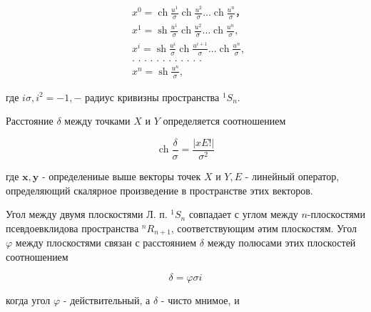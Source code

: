 \documentclass[10pt]{article}
\begin{document}
\[

\begin{aligned}

& x^{0}=\operatorname{ch} \frac{u^{1}}{\sigma} \operatorname{ch} \frac{u^{2}}{\sigma} \ldots \operatorname{ch} \frac{u^{n}}{\sigma} ， \\

& x^{1}=\operatorname{sh} \frac{u^{1}}{\sigma} \operatorname{ch} \frac{u^{2}}{\sigma} \ldots \operatorname{ch} \frac{u^{n}}{\sigma}, \\

& x^{i}=\operatorname{sh} \frac{u^{i}}{\sigma} \operatorname{ch} \frac{u^{i+1}}{\sigma} \ldots \operatorname{ch} \frac{u^{n}}{\sigma} \text {, } \\

& \text {. . . . . . . . . . . . } \\

& x^{n}=\operatorname{sh} \frac{u^{n}}{\sigma},

\end{aligned}

\]



где $i \sigma, i^{2}=-1,-$ радиус кривизны пространства ${ }^{1} S_{n}$.



Расстояние $\delta$ между точками $X$ и $Y$ определяется соотношением



\[

\operatorname{ch} \frac{\delta}{\sigma}=\frac{|x E !|}{\sigma^{2}}

\]



где $\boldsymbol{x}, \boldsymbol{y}$ - определениые выше векторы точек $X$ и $Y, E$ - линейный оператор, определяющий скалярное произведение в пространстве этих векторов.



Угол между двумя плоскостями Л. п. ${ }^{1} S_{n}$ совпадает с углом между $n$-плоскостями псевдоевклидова пространства ${ }^{n} R_{n+1}$, соответствующим әтим плоскостям. Угол $\varphi$ между плоскостями связан с расстоянием $\delta$ между полюсами этих плоскостей соотношением



\[

\delta=\varphi \sigma i

\]



когда угол $\varphi$ - действительный, а $\delta$ - чисто мнимое, и
\end{document}
